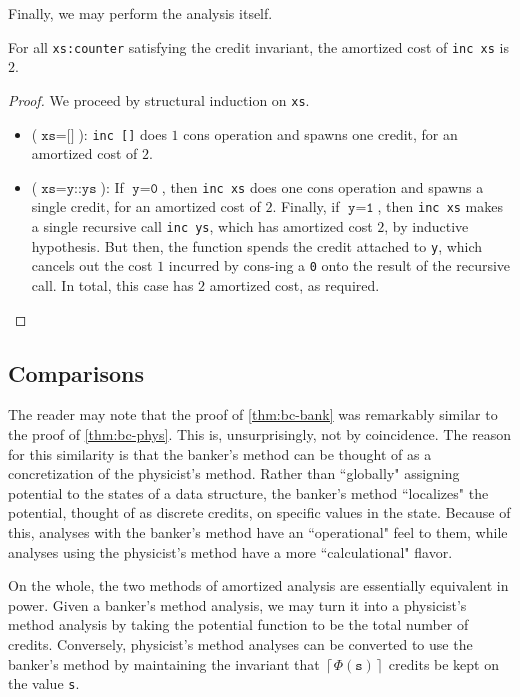 Finally, we may perform the analysis itself.

\begin{theorem}
For all \texttt{xs:counter} satisfying the credit invariant, the amortized cost of \texttt{inc xs} is $2$.
\end{theorem}
\label{thm:bc-bank}
\begin{proof}
We proceed by structural induction on \texttt{xs}.
\begin{itemize}
  \item ($\texttt{xs} = \texttt{[]}$): \texttt{inc []} does $1$ cons operation and spawns one credit, for an amortized cost of $2$.
  \item ($\texttt{xs} = \texttt{y::ys}$): If $\texttt{y} = \texttt{0}$, then \texttt{inc xs} does one cons operation and spawns a single credit, for an amortized cost of $2$. Finally, if $\texttt{y} = \texttt{1}$, then \texttt{inc xs} makes a single recursive call \texttt{inc ys}, which has amortized cost $2$, by inductive hypothesis. But then, the function spends the credit attached to \texttt{y}, which cancels out the cost $1$ incurred by cons-ing a \texttt{0} onto the result of the recursive call. In total, this case has $2$ amortized cost, as required.
\end{itemize}
\end{proof}

\subsection{Comparisons}

The reader may note that the proof of \autoref{thm:bc-bank} was remarkably similar to the proof of \autoref{thm:bc-phys}. This is, unsurprisingly, not by coincidence. The reason for this similarity is that the banker's method can be thought of as a concretization of the physicist's method. Rather than ``globally" assigning potential to the states of a data structure, the banker's method ``localizes" the potential, thought of as discrete credits, on  specific values in the state. Because of this, analyses with the banker's method have an ``operational" feel to them, while analyses using the physicist's method have a more ``calculational" flavor.

On the whole, the two methods of amortized analysis are essentially equivalent in power. Given a banker's method analysis, we may turn it into a physicist's method analysis by taking the potential function to be the total number of credits. Conversely, physicist's method analyses can be converted to use the banker's method by maintaining the invariant that $ \left\lceil{\Phi(\texttt{s})}\right \rceil$ credits be kept on the value \texttt{s}.

